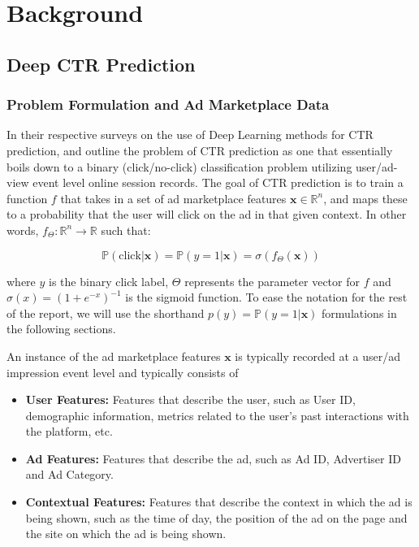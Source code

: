 \documentclass{mldsmsc}
\begin{document}
\chapter{Background}
\label{chap:background}

\section{Deep CTR Prediction}

\subsection{Problem Formulation and Ad Marketplace Data}
\label{sec:problem-formulation-data}

In their respective surveys on the use of Deep Learning methods for CTR prediction, \cite{RefWorks:gu2021ad} 
and \cite{RefWorks:zhang2021deep} outline the problem of CTR prediction as one that essentially boils down to
a binary (click/no-click) classification problem utilizing user/ad-view event level online session records. 
The goal of CTR prediction is to train a function $f$ that takes in a set of ad marketplace 
features $\mathbf{x} \in \mathbb{R}^n$, and maps these to a probability that the user 
will click on the ad in that given context. In other words, $f_{\Theta}: \mathbb{R}^n \rightarrow \mathbb{R}$ such that:

\begin{equation}
\label{eqn:ctr-classifier}
\mathbb{P}(\text{click}| \mathbf{x})
= \mathbb{P}(y = 1 | \mathbf{x})
= \sigma(f_{\Theta}(\mathbf{x}))
\end{equation}

where $y$ is the binary click label, $\Theta$ represents the parameter vector for $f$ and
$\sigma(x)=(1 + e^{-x})^{-1}$ is the sigmoid function. To ease the notation for the rest of the report,
we will use the shorthand $p(y) = \mathbb{P}(y=1 | \mathbf{x})$ formulations in the following
sections. 

An instance of the ad marketplace features $\mathbf{x}$ is typically
recorded at a user/ad impression event level and typically consists of

\begin{itemize}
\item \textbf{User Features:} Features that describe the user, such as User ID, demographic information,
metrics related to the user's past interactions with the platform, etc.
\item \textbf{Ad Features:} Features that describe the ad, such as Ad ID, Advertiser ID and Ad Category.
\item \textbf{Contextual Features:} Features that describe the context in which the ad is being shown, such as
the time of day, the position of the ad on the page and the site on which the ad is being shown.
\end{itemize}
\end{document}
